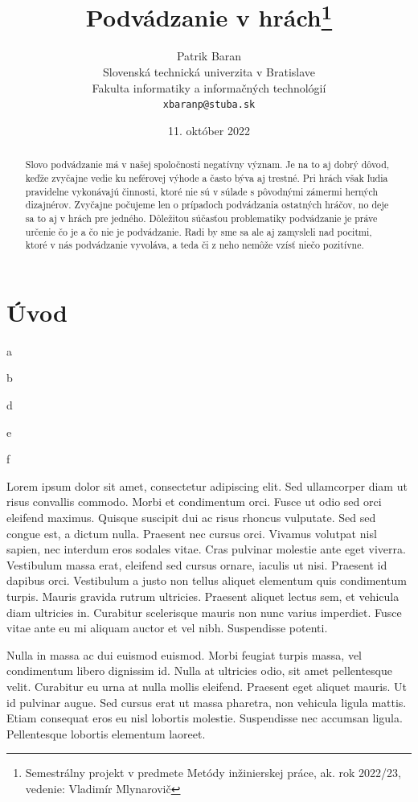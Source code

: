 \documentclass[10pt,twoside,slovak,a4paper]{article}
\title{Podvádzanie v hrách\thanks{Semestrálny projekt v predmete Metódy inžinierskej práce, ak. rok 2022/23, vedenie: Vladimír Mlynarovič}} %
\author{Patrik Baran\\[2pt]
	{\small Slovenská technická univerzita v Bratislave}\\
	{\small Fakulta informatiky a informačných technológií}\\
	{\small \texttt{xbaranp@stuba.sk}}
	}
\date{\small 11. október 2022} %
\begin{document}
\maketitle

\begin{abstract}
Slovo podvádzanie má v našej spoločnosti negatívny význam. Je na to aj dobrý dôvod, keďže zvyčajne vedie ku neférovej výhode a často býva aj trestné. Pri hrách však ľudia pravidelne vykonávajú činnosti, ktoré nie sú v súlade s pôvodnými zámermi herných dizajnérov. Zvyčajne počujeme len o prípadoch podvádzania ostatných hráčov, no deje sa to aj v hrách pre jedného. Dôležitou súčasťou problematiky podvádzanie je práve určenie čo je a čo nie je podvádzanie. Radi by sme sa ale aj zamysleli  nad pocitmi, ktoré v nás podvádzanie vyvoláva, a teda či z neho nemôže vzísť niečo pozitívne.
\end{abstract}



\section{Úvod}
a\cite{10.1145/3410404.3414252}

b\cite{8520644}

d\cite{10.1145/3524842.3527937}

e\cite{uvidime}

f\cite{7325505}

Lorem ipsum dolor sit amet, consectetur adipiscing elit. Sed ullamcorper diam ut risus convallis commodo. Morbi et condimentum orci. Fusce ut odio sed orci eleifend maximus. Quisque suscipit dui ac risus rhoncus vulputate. Sed sed congue est, a dictum nulla. Praesent nec cursus orci. Vivamus volutpat nisl sapien, nec interdum eros sodales vitae. Cras pulvinar molestie ante eget viverra. Vestibulum massa erat, eleifend sed cursus ornare, iaculis ut nisi. Praesent id dapibus orci. Vestibulum a justo non tellus aliquet elementum quis condimentum turpis. Mauris gravida rutrum ultricies. Praesent aliquet lectus sem, et vehicula diam ultricies in. Curabitur scelerisque mauris non nunc varius imperdiet. Fusce vitae ante eu mi aliquam auctor et vel nibh. Suspendisse potenti.

Nulla in massa ac dui euismod euismod. Morbi feugiat turpis massa, vel condimentum libero dignissim id. Nulla at ultricies odio, sit amet pellentesque velit. Curabitur eu urna at nulla mollis eleifend. Praesent eget aliquet mauris. Ut id pulvinar augue. Sed cursus erat ut massa pharetra, non vehicula ligula mattis. Etiam consequat eros eu nisl lobortis molestie. Suspendisse nec accumsan ligula. Pellentesque lobortis elementum laoreet.
\end{document}
